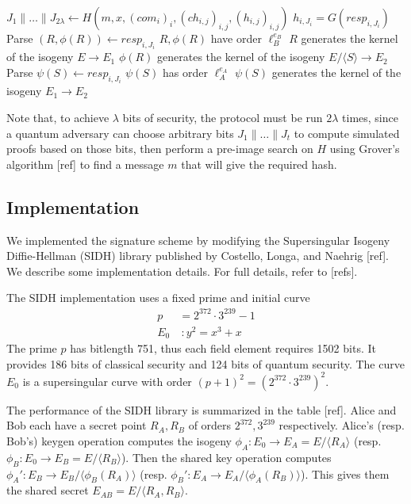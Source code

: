\documentclass{amsart}
\theoremstyle{plain}
\theoremstyle{remark}
\numberwithin{equation}{section}
\begin{document}
\begin{algorithm}[ht]
\caption*{$ver(pk,m, \sigma)$}
\begin{algorithmic}
\STATE $J_1 \| \dots \| J_{2\lambda} \leftarrow H(m,x, (com_i)_i, (ch_{i,j})_{i,j}, (h_{i,j})_{i,j})$ 
\vspace{2mm}
	 $h_{i,J_i} = G(resp_{i,J_i})$
		\STATE Parse $(R,\phi(R))\leftarrow resp_{i,J_i}$
		 $R,\phi(R)$ have order $\ell_B^{e_B}$
		 $R$ generates the kernel of the isogeny $E \to E_1$
		 $\phi(R)$ generates the kernel of the isogeny $E/\langle S \rangle \to E_2$
	\ELSE
		\STATE Parse $\psi(S) \leftarrow resp_{i,J_i}$
		 $\psi(S)$ has order $\ell_A^{e_A}$
		 $\psi(S)$ generates the kernel of the isogeny $E_1 \to E_2$ 
	\ENDIF
\ENDFOR
{}
\ENDIF
\end{algorithmic}
\end{algorithm}

Note that, to achieve $\lambda$ bits of security, the protocol must be run $2\lambda$ times, since a quantum adversary can choose arbitrary bits $J_1 \| \dots \| J_t$ to compute simulated proofs based on those bits, then perform a pre-image search on $H$ using Grover's algorithm [ref] to find a message $m$ that will give the required hash.





\subsection{Implementation}
We implemented the signature scheme by modifying the Supersingular Isogeny Diffie-Hellman (SIDH) library published by Costello, Longa, and Naehrig [ref]. We describe some implementation details. For full details, refer to [refs].

The SIDH implementation uses a fixed prime and initial curve
\begin{align*}
p &= 2^{372}\cdot 3^{239}-1 \\
E_0\!\!&\ : y^2 = x^3+x
\end{align*}
The prime $p$ has bitlength 751, thus each field element requires 1502 bits. It provides 186 bits of classical security and 124 bits of quantum security. The curve $E_0$ is a supersingular curve with order $(p+1)^2 = (2^{372}\cdot 3^{239})^2$.

The performance of the SIDH library is summarized in the table [ref]. Alice and Bob each have a secret point $R_A,R_B$ of orders $2^{372}, 3^{239}$ respectively.
Alice's (resp. Bob's) keygen operation computes the isogeny $\phi_A:E_0 \to E_A= E/\langle R_A\rangle$ (resp. $\phi_B:E_0 \to E_B= E/\langle R_B \rangle$). Then the shared key operation computes $\phi_A':E_B \to E_B / \langle \phi_B(R_A)\rangle$ (resp. $\phi_B': E_A \to E_A/ \langle \phi_A(R_B)\rangle$). This gives them the shared secret $E_{AB} = E/\langle R_A,R_B\rangle$. 
\end{document}

